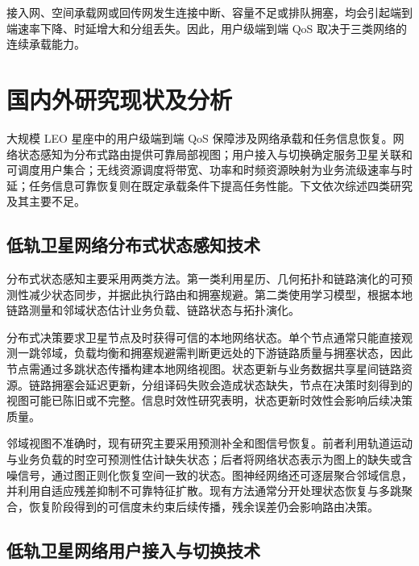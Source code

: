 接入网、空间承载网或回传网发生连接中断、容量不足或排队拥塞，均会引起端到端速率下降、时延增大和分组丢失。因此，用户级端到端 QoS 取决于三类网络的连续承载能力。

\section{国内外研究现状及分析}

大规模 LEO 星座中的用户级端到端 QoS 保障涉及网络承载和任务信息恢复。网络状态感知为分布式路由提供可靠局部视图；用户接入与切换确定服务卫星关联和可调度用户集合；无线资源调度将带宽、功率和时频资源映射为业务流级速率与时延；任务信息可靠恢复则在既定承载条件下提高任务性能。下文依次综述四类研究及其主要不足。

\subsection{低轨卫星网络分布式状态感知技术}
\label{sec:dist-arch}

分布式状态感知主要采用两类方法。第一类利用星历、几何拓扑和链路演化的可预测性减少状态同步，并据此执行路由和拥塞规避\cite{duan-AdaptiveRouteDistributedLEO-TAES25,zhang-LiR-Arxiv25,Huang-LyapunovOptRouting-TMC25}。第二类使用学习模型，根据本地链路测量和邻域状态估计业务负载、链路状态与拓扑演化。

分布式决策要求卫星节点及时获得可信的本地网络状态。单个节点通常只能直接观测一跳邻域，负载均衡和拥塞规避需判断更远处的下游链路质量与拥塞状态，因此节点需通过多跳状态传播构建本地网络视图\cite{ran-DistributedRoutingGNN-TVT25,chen-MIXRouting-IoTJ25}。状态更新与业务数据共享星间链路资源。链路拥塞会延迟更新，分组译码失败会造成状态缺失，节点在决策时刻得到的视图可能已陈旧或不完整\cite{chuai-ResourceAllocation-TON19}。信息时效性研究表明，状态更新时效性会影响后续决策质量\cite{Yates-AoI-JSAC21}。

邻域视图不准确时，现有研究主要采用预测补全和图信号恢复。前者利用轨道运动与业务负载的时空可预测性估计缺失状态\cite{gong-TrafficPrediction-IoTJ25}；后者将网络状态表示为图上的缺失或含噪信号，通过图正则化恢复空间一致的状态\cite{Nagahama-GraphSignalRestoration-TSP22,Money-OnlineEdgeFlowImputation-SPL23}。图神经网络还可逐层聚合邻域信息，并利用自适应残差抑制不可靠特征扩散\cite{Zhang-GNNRLRouting-ICCC23,liu-GNNAdaptiveResidual-NeurIPS21}。现有方法通常分开处理状态恢复与多跳聚合，恢复阶段得到的可信度未约束后续传播，残余误差仍会影响路由决策。

\subsection{低轨卫星网络用户接入与切换技术}


